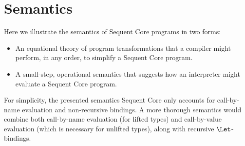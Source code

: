\documentclass{article}
\begin{document}

\section{Semantics}
\label{sec:semantics}

Here we illustrate the semantics of Sequent Core programs in two forms:
\begin{itemize}
\item An equational theory of program transformations that a compiler might
  perform, in any order, to simplify a Sequent Core program.
\item A small-step, operational semantics that suggests how an interpreter might
  evaluate a Sequent Core program.
\end{itemize}
For simplicity, the presented semantics Sequent Core only accounts for
call-by-name evaluation and non-recursive bindings.  A more thorough semantics
would combine both call-by-name evaluation (for lifted types) and call-by-value
evaluation (which is necessary for unlifted types), along with recursive
$\Let$-bindings.
\end{document}
